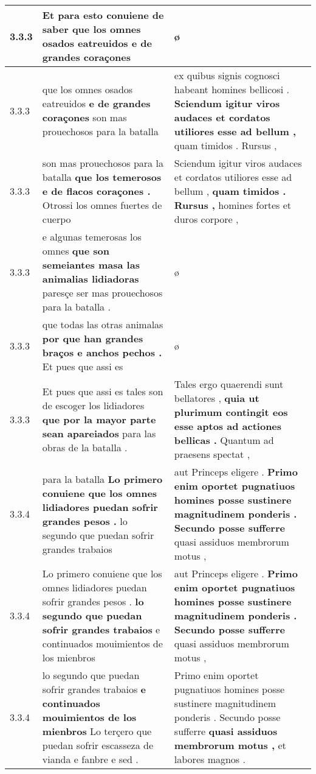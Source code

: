 \begin{tabular}{|p{1cm}|p{6.5cm}|p{6.5cm}|}
3.3.3 & Et para esto conuiene de saber \textbf{ que los omnes osados eatreuidos } e de grandes coraçones & ø \\\hline
3.3.3 & que los omnes osados eatreuidos \textbf{ e de grandes coraçones } son mas prouechosos para la batalla & ex quibus signis cognosci habeant homines bellicosi . \textbf{ Sciendum igitur viros audaces et cordatos utiliores esse ad bellum , } quam timidos . Rursus , \\\hline
3.3.3 & son mas prouechosos para la batalla \textbf{ que los temerosos e de flacos coraçones . } Otrossi los omnes fuertes de cuerpo & Sciendum igitur viros audaces et cordatos utiliores esse ad bellum , \textbf{ quam timidos . Rursus , } homines fortes et duros corpore , \\\hline
3.3.3 & e algunas temerosas los omnes \textbf{ que son semeiantes masa las animalias lidiadoras } paresçe ser mas prouechosos para la batalla . & ø \\\hline
3.3.3 & que todas las otras animalas \textbf{ por que han grandes braços e anchos pechos . } Et pues que assi es & ø \\\hline
3.3.3 & Et pues que assi es tales son de escoger los lidiadores \textbf{ que por la mayor parte sean apareiados } para las obras de la batalla . & Tales ergo quaerendi sunt bellatores , \textbf{ quia ut plurimum contingit eos esse aptos ad actiones bellicas . } Quantum ad praesens spectat , \\\hline
3.3.4 & para la batalla \textbf{ Lo primero conuiene que los omnes lidiadores puedan sofrir grandes pesos . } lo segundo que puedan sofrir grandes trabaios & aut Princeps eligere . \textbf{ Primo enim oportet pugnatiuos homines posse sustinere magnitudinem ponderis . Secundo posse sufferre } quasi assiduos membrorum motus , \\\hline
3.3.4 & Lo primero conuiene que los omnes lidiadores puedan sofrir grandes pesos . \textbf{ lo segundo que puedan sofrir grandes trabaios } e continuados mouimientos de los mienbros & aut Princeps eligere . \textbf{ Primo enim oportet pugnatiuos homines posse sustinere magnitudinem ponderis . Secundo posse sufferre } quasi assiduos membrorum motus , \\\hline
3.3.4 & lo segundo que puedan sofrir grandes trabaios \textbf{ e continuados mouimientos de los mienbros } Lo terçero que puedan sofrir escasseza de vianda e fanbre e sed . & Primo enim oportet pugnatiuos homines posse sustinere magnitudinem ponderis . Secundo posse sufferre \textbf{ quasi assiduos membrorum motus , } et labores magnos . \\\hline

\end{tabular}
